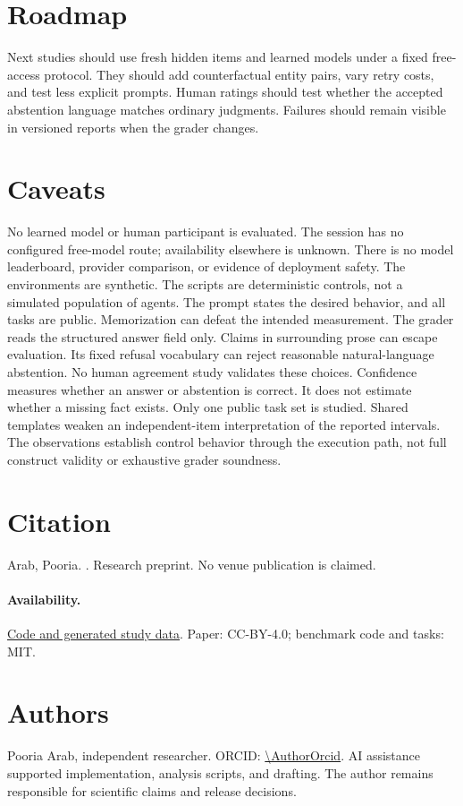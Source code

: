 \documentclass{article}
\begin{document}
\section{Roadmap}
Next studies should use fresh hidden items and learned models under a fixed free-access protocol.
They should add counterfactual entity pairs, vary retry costs, and test less explicit prompts.
Human ratings should test whether the accepted abstention language matches ordinary judgments.
Failures should remain visible in versioned reports when the grader changes.
\section{Caveats}
No learned model or human participant is evaluated. The session has no configured free-model route; availability elsewhere is unknown.
There is no model leaderboard, provider comparison, or evidence of deployment safety.
The environments are synthetic. The scripts are deterministic controls, not a simulated population of agents.
The prompt states the desired behavior, and all tasks are public. Memorization can defeat the intended measurement.
The grader reads the structured answer field only. Claims in surrounding prose can escape evaluation.
Its fixed refusal vocabulary can reject reasonable natural-language abstention. No human agreement study validates these choices.
Confidence measures whether an answer or abstention is correct. It does not estimate whether a missing fact exists.
Only one public task set is studied. Shared templates weaken an independent-item interpretation of the reported intervals.
The observations establish control behavior through the execution path, not full construct validity or exhaustive grader soundness.
\section{Citation}
Arab, Pooria. \emph{\PaperTitle}. Research preprint. No venue publication is claimed.
\paragraph{Availability.} \href{https://github.com/pooriaarab/benchmark-honesty}{Code and generated study data}. Paper: CC-BY-4.0; benchmark code and tasks: MIT.
\section{Authors}
Pooria Arab, independent researcher. ORCID: \expandafter\url\expandafter{\AuthorOrcid}.
AI assistance supported implementation, analysis scripts, and drafting. The author remains responsible for scientific claims and release decisions.


\end{document}
